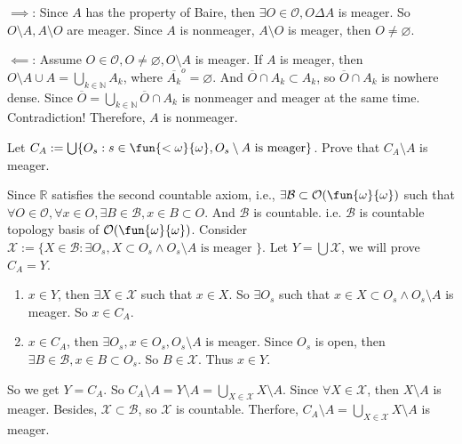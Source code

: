 \documentclass{ctexart}
\begin{document}
\begin{solution}
  \(\implies\): Since \(A\) has the property of Baire, then \(\exists O \in \mathcal{O},O \Delta A\) is meager. 
  So \(O \setminus A,A \setminus O\) are meager. 
  Since \(A\) is nonmeager, \(A \setminus O\) is meager, then \(O \neq \varnothing\). 

  \(\impliedby\): Assume \(O \in \mathcal{O}, O \neq \varnothing, O \setminus A\) is meager. 
  If \(A\) is meager, then \(O \setminus A \cup A = \bigcup_{k \in \mathbb{N}} A_k  \), where \(\overline{A_{k}}^o= \varnothing\).
  And \(\overline{O} \cap A_k \subset A_k\), so \(\overline{O} \cap A_k\) is nowhere dense.
  Since \(\overline{O} = \bigcup_{k \in \mathbb{N}} \overline{O} \cap A_k \) is nonmeager and meager at the same time.
  Contradiction! Therefore, \(A\) is nonmeager. 
\end{solution}

\begin{problem}
  Let \(C_A:= \bigcup \{O_s:s \in \fun{<\omega}{\omega},O_s\setminus A \text{ is meager}\} \). 
  Prove that \(C_A \setminus A \) is meager. 
\end{problem}

\begin{solution}
  Since \(\mathbb{R}\) satisfies the second countable axiom, i.e., \(\exists \mathcal{B} \subset \mathcal{O}(\fun{\omega}{\omega})\) such that \(\forall O \in \mathcal{O},\forall x \in O,\exists B \in \mathcal{B},x \in B \subset O\).
  And \(\mathcal{B}\) is countable. i.e. \(\mathcal{B}\) is countable topology basis of \(\mathcal{O}(\fun{\omega}{\omega})\).
  Consider \(\mathcal{X}:=\{X \in \mathcal{B}:\exists O_s,X \subset O_s \wedge O_s \setminus A \text{ is meager }\}\). 
  Let \(Y= \bigcup \mathcal{X} \), we will prove \(C_A = Y\). 
  \begin{enumerate}
    \item \(x \in Y\), then \(\exists X \in \mathcal{X}\) such that \(x \in X\). 
  So \(\exists O_s\) such that \(x \in X \subset O_s \wedge O_s \setminus A\) is meager. So \(x \in C_A\). 
\item \(x \in C_A\), then \(\exists O_s,x \in O_s,O_s \setminus A\) is meager.  
  Since \(O_s\) is open, then \(\exists B \in \mathcal{B},x \in B \subset O_s\). 
  So \(B \in \mathcal{X}\). Thus \(x \in Y\). 

  \end{enumerate}
  So we get \(Y = C_A\). So \(C_A\setminus A=Y\setminus A = \bigcup_{X \in \mathcal{X}} X \setminus A \). 
  Since \(\forall X \in \mathcal{X}\), then \(X \setminus A\) is meager. Besides,
  \(\mathcal{X} \subset \mathcal{B}\), so \(\mathcal{X}\) is countable. 
  Therfore, \(C_A \setminus A = \bigcup_{X \in \mathcal{X}} X \setminus A\) is meager. 
\end{solution}
\end{document}
